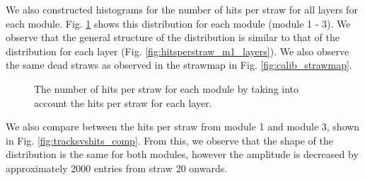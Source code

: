 \documentclass[a4paper]{report}
\numberwithin{equation}{section}
\begin{document}
We also constructed histograms for the number of hits per straw for all layers for each module. Fig. \ref{fig:hitsperstraw_modules} shows this distribution for 
each module (module 1 - 3). We observe that the general structure of the distribution is similar to that of the distribution for 
each layer (Fig. \ref{fig:hitsperstraw_m1_layers}). We also observe the same dead straws as observed in the strawmap in Fig. \ref{fig:calib_strawmap}.


\begin{figure}[htb!]
	\centering
	\quad
	\centering
	\quad
	\centering
	\caption{The number of hits per straw for each module by taking into account the hits per straw for each layer. }
	\label{fig:hitsperstraw_modules}
\end{figure}

We also compare between the hits per straw from module 1 and module 3, shown in Fig. \ref{fig:tracksvshits_comp}. From this, we observe that the shape of the 
distribution is the same for both modules, however the amplitude is decreased by approximately 2000 entries from straw 20 onwards. 
\end{document}
